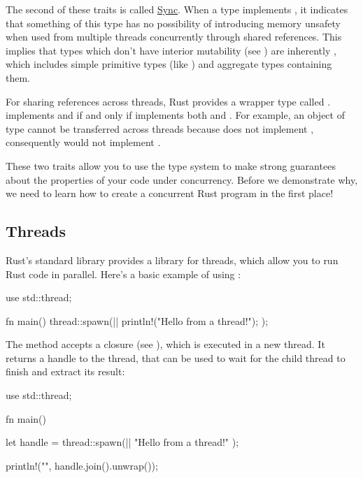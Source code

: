 
The second of these traits is called \href{https://doc.rust-lang.org/std/marker/trait.Sync.html}{Sync}. When a type  
implements , it indicates that something of this type has no possibility of introducing memory unsafety when used from 
multiple threads concurrently through shared references. This implies that types which don't have interior mutability (see 
) are inherently , which includes simple primitive types (like ) and aggregate 
types containing them.

\blank

For sharing references across threads, Rust provides a wrapper type called .  implements  and 
 if and only if  implements both  and . For example, an object of type  
cannot be transferred across threads because  does not implement , consequently  would 
not implement .

\blank

These two traits allow you to use the type system to make strong guarantees about the properties of your code under concurrency. 
Before we demonstrate why, we need to learn how to create a concurrent Rust program in the first place!

\subsection*{Threads}

Rust's standard library provides a library for threads, which allow you to run Rust code in parallel. Here's a basic example of using 
:

\begin{rustc}
use std::thread;

fn main() {
    thread::spawn(|| {
        println!("Hello from a thread!");
    });
}
\end{rustc}

The  method accepts a closure (see ), which is executed in a new thread. It returns 
a handle to the thread, that can be used to wait for the child thread to finish and extract its result:

\begin{rustc}
use std::thread;

fn main() {
    let handle = thread::spawn(|| {
        "Hello from a thread!"
    });

    println!("{}", handle.join().unwrap());
}
\end{rustc}

